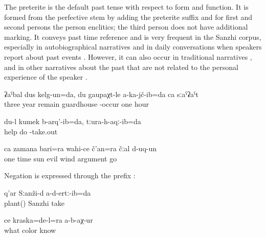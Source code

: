 The preterite is the default past tense with respect to form and function. It is formed from the perfective stem by adding the preterite suffix and for first and second persons the person enclitics; the third person does not have additional marking. It conveys past time reference and is very frequent in the Sanzhi corpus, especially in autobiographical narratives  and in daily conversations when speakers report about past events . However, it can also occur in traditional narratives ,  and in other narratives about the past that are not related to the personal experience of the speaker .
%
\begin{exe}

	\ex	\label{ex:Three years I remained, I was not one single hour at the guardhouse}
	\gll	ʡaˁbal	dus	kelg-un=da,		du	gaupaχt-le	a-ka-jč-ib=da	ca	sːaˁʡaˁt\\
		three	year	remain			guardhouse	-occur	one	hour\\
	\glt	{}

\ex	\label{ex:I helped. I pulled him out}
	\gll	du-l	kumek	b-arq'-ib=da,	tːura-h-aqː-ib=da\\
			help	do	-take.out\\
	\glt	{}
	
	\ex	\label{ex:Once upon a time the sun and the evil wind argued analytic}
	\gll	ca	zamana	bari=ra	wahi-ce	č'an=ra	čːal	d-uq-un\\
		one	time	sun	evil	wind	argument	go\\
	\glt	{}
\end{exe}

Negation is expressed through the prefix :
%
\begin{exe}
	\ex	\label{ex:We did not gather plants in Sanzhi}
	\gll	q'ar	Sːanži-d	a-d-ertː-ib=da\\
		plant()	Sanzhi	take\\
	\glt	{}

	\ex	\label{ex:Nobody found out what colour this is}
	\gll	ce	kraska=de-l=ra	a-b-aχ-ur\\
		what	color	know\\
	\glt	{}
\end{exe}


